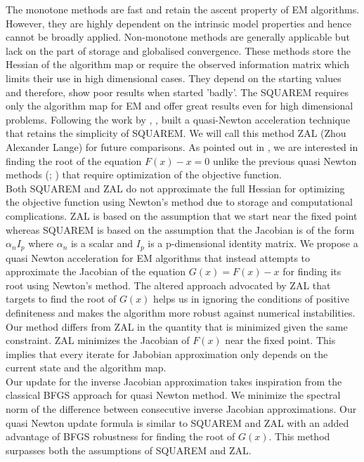 \documentclass[12pt]{article}
\begin{document}
The monotone methods are fast and retain the ascent property of EM algorithms. However, they are highly dependent on the intrinsic model properties and hence cannot be broadly applied. Non-monotone methods are generally applicable but lack on the part of storage and globalised convergence. These methods store the Hessian of the algorithm map or require the observed information matrix which limits their use in high dimensional cases. They depend on the starting values and therefore, show poor results when started 'badly'. The SQUAREM requires only the algorithm map for EM and offer great results even for high dimensional problems. Following the work by \cite{varadhan2008simple}, \cite{zhou2011quasi}, built a quasi-Newton acceleration technique that retains the simplicity of SQUAREM. We will call this method ZAL (Zhou Alexander Lange) for future comparisons. As pointed out in \cite{zhou2011quasi}, we are interested in finding the root of the equation $F(x) - x = 0$ unlike the previous quasi Newton methods (\cite{jamshidian1997acceleration}; \cite{lange1995quasi}) that require optimization of the objective function. \\

Both SQUAREM and ZAL do not approximate the full Hessian for optimizing the objective function using Newton's method due to storage and computational complications. ZAL is based on the assumption that we start near the fixed point whereas SQUAREM is based on the assumption that the Jacobian is of the form $\alpha_n I_p$ where $\alpha_n$ is a scalar and $I_p$ is a p-dimensional identity matrix. We propose a quasi Newton acceleration for EM algorithms that instead attempts to approximate the Jacobian of the equation $G(x) = F(x) - x$ for finding its root using Newton's method. The altered approach advocated by ZAL that targets to find the root of $G(x)$ helps us in ignoring the conditions of positive definiteness and makes the algorithm more robust against numerical instabilities. Our method differs from ZAL in the quantity that is minimized given the same constraint. ZAL minimizes the Jacobian of $F(x)$ near the fixed point. This implies that every iterate for Jabobian approximation only depends on the current state and the algorithm map. \\

Our update for the inverse Jacobian approximation takes inspiration from the classical BFGS approach for quasi Newton method. We minimize the spectral norm of the difference between consecutive inverse Jacobian approximations. Our quasi Newton update formula is similar to SQUAREM and ZAL with an added advantage of BFGS robustness for finding the root of $G(x)$. This method surpasses both the assumptions of SQUAREM and ZAL.\\
\end{document}
